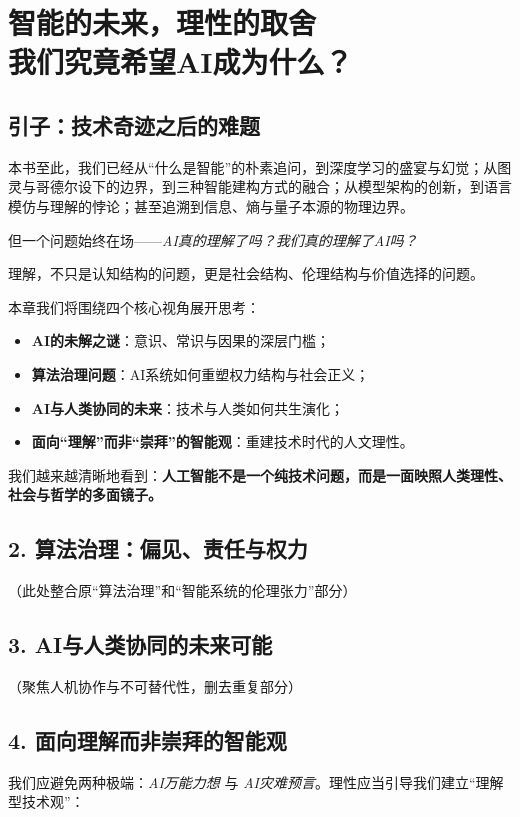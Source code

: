 \chapter{智能的未来，理性的取舍\\\large{}我们究竟希望AI成为什么？}

\section*{引子：技术奇迹之后的难题}
本书至此，我们已经从“什么是智能”的朴素追问，到深度学习的盛宴与幻觉；从图灵与哥德尔设下的边界，到三种智能建构方式的融合；从模型架构的创新，到语言模仿与理解的悖论；甚至追溯到信息、熵与量子本源的物理边界。

但一个问题始终在场——\textit{AI真的理解了吗？我们真的理解了AI吗？}

理解，不只是认知结构的问题，更是社会结构、伦理结构与价值选择的问题。

本章我们将围绕四个核心视角展开思考：

\begin{itemize}
\item \textbf{AI的未解之谜}：意识、常识与因果的深层门槛；
\item \textbf{算法治理问题}：AI系统如何重塑权力结构与社会正义；
\item \textbf{AI与人类协同的未来}：技术与人类如何共生演化；
\item \textbf{面向“理解”而非“崇拜”的智能观}：重建技术时代的人文理性。
\end{itemize}

我们越来越清晰地看到：\textbf{人工智能不是一个纯技术问题，而是一面映照人类理性、社会与哲学的多面镜子。}


\section*{2. 算法治理：偏见、责任与权力}
（此处整合原“算法治理”和“智能系统的伦理张力”部分）

\section*{3. AI与人类协同的未来可能}
（聚焦人机协作与不可替代性，删去重复部分）

\section*{4. 面向理解而非崇拜的智能观}
我们应避免两种极端：\textit{AI万能力想} 与 \textit{AI灾难预言}。理性应当引导我们建立“理解型技术观”：

